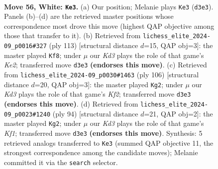 \documentclass[11pt]{article}
\begin{document}
\clearpage

\begin{figure}[p]\centering
\begin{subfigure}{0.46\textwidth}\centering
\resizebox{\linewidth}{!}{%
\newchessgame
\chessboard[
  setfen={8/5p2/4p1k1/R7/P1R1P3/3K1P2/7r/8 w - - 3 56},
  showmover=false,
  pgfstyle=straightmove, color=movearrow, markmove={d3-e3}
]}
\caption{}
\end{subfigure}\hfill
\begin{subfigure}{0.46\textwidth}\centering
\resizebox{\linewidth}{!}{%
\newchessgame
\chessboard[
  setfen={8/4kp2/5rp1/7p/7P/3R2P1/6K1/8 b - - 13 57},
  showmover=false,
  pgfstyle=straightmove, color=movearrow, markmove={e7-f8}
]}
\caption{}
\end{subfigure}
\\[4pt]
\begin{subfigure}{0.46\textwidth}\centering
\resizebox{\linewidth}{!}{%
\newchessgame
\chessboard[
  setfen={8/8/4k1p1/r6p/5R1P/5PP1/5K2/8 w - - 7 54},
  showmover=false,
  pgfstyle=straightmove, color=movearrow, markmove={f2-g2}
]}
\caption{}
\end{subfigure}\hfill
\begin{subfigure}{0.46\textwidth}\centering
\resizebox{\linewidth}{!}{%
\newchessgame
\chessboard[
  setfen={8/8/r5kp/6p1/8/5RP1/5P1P/5K2 w - - 3 48},
  showmover=false,
  pgfstyle=straightmove, color=movearrow, markmove={f1-g2}
]}
\caption{}
\end{subfigure}
\caption{\textbf{Move 56, White: \texttt{Ke3}.} (a) Our position; Melanie plays \texttt{Ke3} (\texttt{d3e3}). Panels (b)--(d) are the retrieved master positions whose correspondence most drove this move (highest QAP objective among those that transfer to it). (b) Retrieved from \texttt{lichess\_elite\_2024-09\_p0016\#327} (ply 113) [structural distance $d$=15, QAP obj=3]: the master played \texttt{Kf8}; under $\mu$ our \emph{Kd3} plays the role of that game's \emph{Ke2}; transferred move \texttt{d3e3} \textbf{(endorses this move)}. (c) Retrieved from \texttt{lichess\_elite\_2024-09\_p0030\#1463} (ply 106) [structural distance $d$=20, QAP obj=3]: the master played \texttt{Kg2}; under $\mu$ our \emph{Kd3} plays the role of that game's \emph{Kf2}; transferred move \texttt{d3e3} \textbf{(endorses this move)}. (d) Retrieved from \texttt{lichess\_elite\_2024-09\_p0023\#1240} (ply 94) [structural distance $d$=21, QAP obj=2]: the master played \texttt{Kg2}; under $\mu$ our \emph{Kd3} plays the role of that game's \emph{Kf1}; transferred move \texttt{d3e3} \textbf{(endorses this move)}. Synthesis: 5 retrieved analogs transferred to \texttt{Ke3} (summed QAP objective 11, the strongest correspondence among the candidate moves); Melanie committed it via the \texttt{search} selector.}
\label{fig:thought-m110}
\end{figure}
\end{document}
